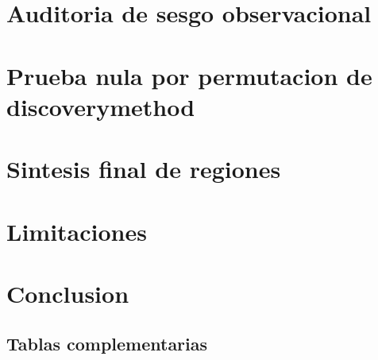 \documentclass[11pt]{article}
\begin{document}
\section{Auditoria de sesgo observacional}

\section{Prueba nula por permutacion de discoverymethod}

\section{Sintesis final de regiones}

\section{Limitaciones}

\section{Conclusion}

\FloatBarrier
\clearpage
\begin{landscape}
\section*{Tablas complementarias}

\end{landscape}
\end{document}
